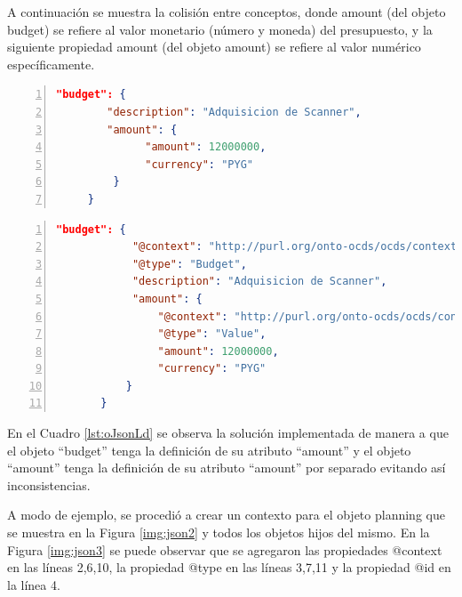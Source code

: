 A continuación se muestra la colisión entre conceptos, donde amount (del objeto budget) se refiere al valor monetario (número y moneda) del presupuesto, y la siguiente propiedad amount (del objeto amount) se refiere al valor numérico específicamente.\hfill \break

\noindent\begin{minipage}{\textwidth}
\begin{lstlisting}[captionpos=b, caption=Objeto JSON con colisión semántica entre conceptos, label=lst:oJson,language=json,firstnumber=1,  numbers=left,  numberstyle=\tiny\color{mygray},
    basicstyle=\linespread{0.8}\footnotesize\ttfamily,frame=single]
    "budget": {
        "description": "Adquisicion de Scanner",
        "amount": {
              "amount": 12000000,
              "currency": "PYG"
         }
     }  
    \end{lstlisting}
\end{minipage}
\noindent
\begin{minipage}{\textwidth}
    \begin{lstlisting}[captionpos=b, caption=Objeto JSON-LD. Sin colisión semántica entre conceptos , label=lst:oJsonLd, language=json,firstnumber=1,  numbers=left,  numberstyle=\tiny\color{mygray},
    basicstyle=\footnotesize\ttfamily,frame=single]
        "budget": {
            "@context": "http://purl.org/onto-ocds/ocds/context-budget.json",
            "@type": "Budget",
            "description": "Adquisicion de Scanner",
            "amount": {
                "@context": "http://purl.org/onto-ocds/ocds/context-value.json",
                "@type": "Value",
                "amount": 12000000,
                "currency": "PYG"
           }
       }   
        \end{lstlisting}
    \end{minipage}

        En el Cuadro \ref{lst:oJsonLd} se observa la solución implementada de manera a que el objeto “budget” tenga la definición de su atributo “amount” y el objeto “amount” tenga la definición de su atributo “amount” por separado evitando así inconsistencias.

A modo de ejemplo, se procedió a crear un contexto para el objeto planning que se muestra en la Figura \ref{img:json2} y todos los objetos hijos del mismo. En la Figura \ref{img:json3} se puede observar que se agregaron las propiedades @context en las líneas 2,6,10, la propiedad @type en las líneas 3,7,11 y la propiedad @id en la línea 4.

